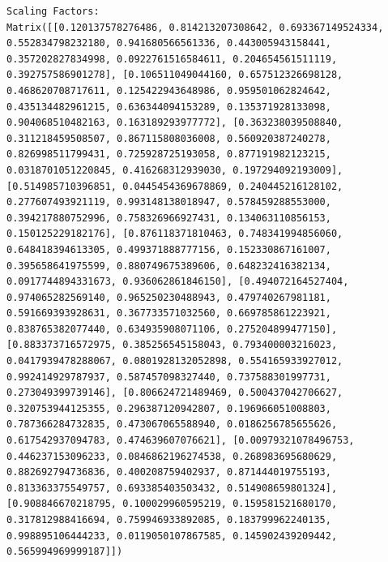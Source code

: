 \documentclass[
  letterpaper,
  DIV=11,
  numbers=noendperiod]{scrreprt}
\theoremstyle{plain}
\theoremstyle{definition}
\theoremstyle{remark}
\begin{document}
\begin{verbatim}
Scaling Factors:
Matrix([[0.120137578276486, 0.814213207308642, 0.693367149524334, 0.552834798232180, 0.941680566561336, 0.443005943158441, 0.357202827834998, 0.0922761516584611, 0.204654561511119, 0.392757586901278], [0.106511049044160, 0.657512326698128, 0.468620708717611, 0.125422943648986, 0.959501062824642, 0.435134482961215, 0.636344094153289, 0.135371928133098, 0.904068510482163, 0.163189293977772], [0.363238039508840, 0.311218459508507, 0.867115808036008, 0.560920387240278, 0.826998511799431, 0.725928725193058, 0.877191982123215, 0.0318701051220845, 0.416268312939030, 0.197294092193009], [0.514985710396851, 0.0445454369678869, 0.240445216128102, 0.277607493921119, 0.993148138018947, 0.578459288553000, 0.394217880752996, 0.758326966927431, 0.134063110856153, 0.150125229182176], [0.876118371810463, 0.748341994856060, 0.648418394613305, 0.499371888777156, 0.152330867161007, 0.395658641975599, 0.880749675389606, 0.648232416382134, 0.0917744894331673, 0.936062861846150], [0.494072164527404, 0.974065282569140, 0.965250230488943, 0.479740267981181, 0.591669393928631, 0.367733571032560, 0.669785861223921, 0.838765382077440, 0.634935908071106, 0.275204899477150], [0.883373716572975, 0.385256545158043, 0.793400003216023, 0.0417939478288067, 0.0801928132052898, 0.554165933927012, 0.992414929787937, 0.587457098327440, 0.737588301997731, 0.273049399739146], [0.806624721489469, 0.500437042706627, 0.320753944125355, 0.296387120942807, 0.196966051008803, 0.787366284732835, 0.473067065588940, 0.0186256785655626, 0.617542937094783, 0.474639607076621], [0.00979321078496753, 0.446237153096233, 0.0846862196274538, 0.268983695680629, 0.882692794736836, 0.400208759402937, 0.871444019755193, 0.813363375549757, 0.693385403503432, 0.514908659801324], [0.908846670218795, 0.100029960595219, 0.159581521680170, 0.317812988416694, 0.759946933892085, 0.183799962240135, 0.998895106444233, 0.0119050107867585, 0.145902439209442, 0.565994969999187]])


\end{verbatim}
\end{document}
